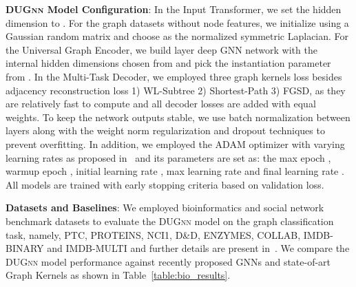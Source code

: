 \documentclass{article}
\begin{document}
\begin{table*}[t!]
{\begin{tabular}
	\end{tabular}}
	
	\caption{Graph classification  accuracy   on bioinformatics and social network datasets. Result in \textbf{bold} indicates the  best reported accuracy. Top half of the table compares results  with  Graph Kernels    while bottom half compares results with Graph Neural Networks.  *On D\&D dataset, we omit computing adjacency reconstruction loss due to GPU memory constraints.} \label{table:bio_results}
	\vspace{-1em}
\end{table*}








\noindent \textbf{\textsc{DUGnn} Model Configuration}: In the Input Transformer,  we set the hidden dimension  to . For  the graph datasets without node features, we initialize  using a Gaussian random matrix and  choose  as the normalized symmetric   Laplacian.
For the Universal Graph Encoder, we build  layer deep GNN network with  the internal hidden dimensions chosen from  and pick the  instantiation parameter from .   In the  Multi-Task Decoder,  we employed  three graph kernels loss besides adjacency reconstruction loss  1) WL-Subtree   2) Shortest-Path     3) FGSD,   as they are relatively fast to compute and all decoder losses are added with equal weights.   To keep the network outputs stable, we use   batch normalization between   layers   along with the   weight norm regularization and dropout  techniques to prevent overfitting.
In addition, we employed the ADAM optimizer with varying learning rates as proposed in~\cite{vaswani2017attention} and its parameters are set as: the max epoch  , warmup epoch , initial learning rate , max learning rate   and final learning rate . All models are trained with early stopping criteria based on validation loss.






\noindent \textbf{Datasets and Baselines}:  We employed    bioinformatics and  social network benchmark  datasets to evaluate the \textsc{DUGnn} model on the graph classification  task, namely,   {\selectfont 
	PTC, PROTEINS, NCI1, D\&D, ENZYMES, COLLAB, IMDB-BINARY} and {\selectfont IMDB-MULTI} and further details are present in~\cite{yanardag2015deep}. We compare the \textsc{DUGnn} model performance against  recently proposed   GNNs and    state-of-art Graph Kernels as shown in Table~\ref{table:bio_results}. 
\end{document}
